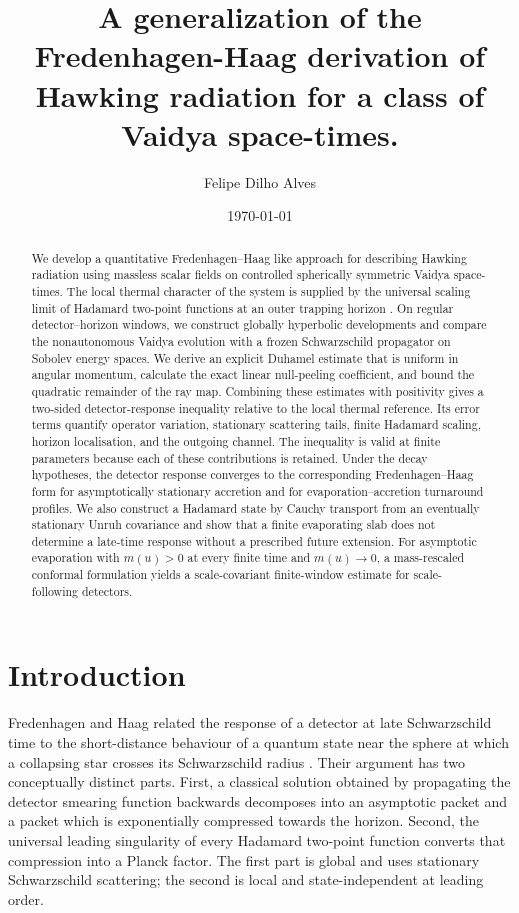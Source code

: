 \documentclass[11pt,a4paper]{article}
\title{A generalization of the Fredenhagen-Haag derivation of Hawking radiation for a class of Vaidya space-times.}
\author{Felipe Dilho Alves}
\date{\today}
\theoremstyle{definition}
\theoremstyle{remark}
\begin{document}
	\maketitle
	
	\begin{abstract}
		We develop a quantitative Fredenhagen--Haag like approach for describing Hawking radiation using massless scalar
		fields on controlled spherically symmetric Vaidya space-times.  The local
		thermal character of the system is supplied by the universal scaling limit of Hadamard
		two-point functions at an outer trapping horizon
		\cite{KurpiczPinamontiVerch2021}.  On regular detector--horizon windows, we
		construct globally hyperbolic developments and compare the nonautonomous
		Vaidya evolution with a frozen Schwarzschild propagator on Sobolev energy
		spaces.  We derive an explicit Duhamel estimate that is uniform in angular
		momentum, calculate the exact linear null-peeling coefficient, and bound the
		quadratic remainder of the ray map.  Combining these estimates with
		positivity gives a two-sided detector-response inequality relative to the
		local thermal reference.  Its error terms quantify operator variation,
		stationary scattering tails, finite Hadamard scaling, horizon localisation,
		and the outgoing channel.  The inequality is valid at finite parameters
		because each of these contributions is retained.  Under the decay hypotheses, the detector response converges to the corresponding
		Fredenhagen--Haag form for asymptotically stationary accretion and for
		evaporation--accretion turnaround profiles.  We also construct a Hadamard
		state by Cauchy transport from an eventually stationary Unruh covariance and
		show that a finite evaporating slab does not determine a late-time response
		without a prescribed future extension.  For asymptotic evaporation with
		$m(u)>0$ at every finite time and $m(u)\to0$, a mass-rescaled conformal
		formulation yields a scale-covariant finite-window estimate for
		scale-following detectors.
	\end{abstract}
	
	\tableofcontents
	
	\section{Introduction}
	
	Fredenhagen and Haag related the response of a detector at late Schwarzschild
	time to the short-distance behaviour of a quantum state near the sphere at
	which a collapsing star crosses its Schwarzschild radius
	\cite{FredenhagenHaag1990}.  Their argument has two conceptually distinct
	parts.  First, a classical solution obtained by propagating the detector
	smearing function backwards decomposes into an asymptotic packet and a packet
	which is exponentially compressed towards the horizon.  Second, the
	universal leading singularity of every Hadamard two-point function converts
	that compression into a Planck factor.  The first part is global and uses
	stationary Schwarzschild scattering; the second is local and
	state-independent at leading order.
	
\end{document}
